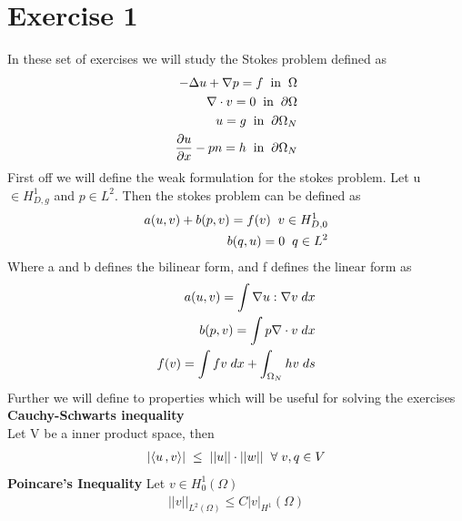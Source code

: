 \documentclass[a4paper,norsk]{article}
\begin{document}
\maketitle
\section*{Exercise 1}
In these set of exercises we will study the Stokes problem defined as 
\begin{align*}
-\Delta u + \nabla p = f \hspace{2mm} \text{in} \hspace{2mm} \Omega \\
\nabla \cdot v = 0 \hspace{2mm} \text{in} \hspace{2mm} \partial\Omega \\
u = g \hspace{2mm} \text{in} \hspace{2mm} \partial\Omega_N \\
\frac{\partial u}{\partial x} - pn = h \hspace{2mm} \text{in} \hspace{2mm} \partial\Omega_N\\
\end{align*}
First off we will define the weak formulation for the stokes problem. Let u $\in H_{D,g}^1$ and $p \in L^2$. Then
the stokes problem can be defined as 
\begin{align*}
a(u, v) + b(p, v) = f(v) \hspace{2mm} v \in H_{D,0}^1 \\
b(q, u) = 0 \hspace{2mm} q \in L^2 
\end{align*}
Where a and b defines the bilinear form, and f defines the linear form as
\begin{align*}
a(u, v) = \int \nabla u : \nabla v \hspace{1mm} dx \\
b(p, v) = \int p \nabla \cdot v \hspace{1mm} dx \\
f(v) = \int f v \hspace{1mm} dx + \int_{\Omega_N} h v \hspace{1mm} ds
\end{align*}
Further we will define to properties which will be useful for solving the exercises \newline \newline
\textbf{Cauchy-Schwarts inequality} \\
Let V be a inner product space, then
\begin{align*}
 |\langle u \,, v \rangle| \hspace{1mm} \leq \hspace{1mm} ||u|| \cdot ||w|| \hspace{2mm} \forall \hspace{1mm} v,q \in V
\end{align*}
\newline
\textbf{Poincare's Inequality}
Let $v \in H_0^1(\Omega)$
\begin{align*}
||v||_{L^2(\Omega)} \leq C |v|_{H^1} (\Omega) 
\end{align*}
\newpage
\end{document}

